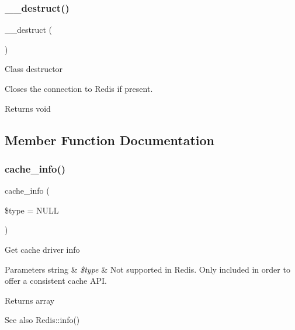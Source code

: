 \subsubsection{\texorpdfstring{\+\_\+\+\_\+destruct()}{\_\_destruct()}}
{\footnotesize\ttfamily \+\_\+\+\_\+destruct (\begin{DoxyParamCaption}{ }\end{DoxyParamCaption})}

Class destructor

Closes the connection to Redis if present.

\begin{DoxyReturn}{Returns}
void 
\end{DoxyReturn}


\subsection{Member Function Documentation}
\mbox{\label{class_c_i___cache__redis_aa8b9c4d9f0387156736ccd8850f0727e}} 
\subsubsection{\texorpdfstring{cache\+\_\+info()}{cache\_info()}}
{\footnotesize\ttfamily cache\+\_\+info (\begin{DoxyParamCaption}\item[{}]{\$type = {\ttfamily NULL} }\end{DoxyParamCaption})}

Get cache driver info


\begin{DoxyParams}[1]{Parameters}
string & {\em \$type} & Not supported in Redis. Only included in order to offer a consistent cache A\+PI. \\
\hline
\end{DoxyParams}
\begin{DoxyReturn}{Returns}
array 
\end{DoxyReturn}
\begin{DoxySeeAlso}{See also}
Redis\+::info() 
\end{DoxySeeAlso}
\mbox{\label{class_c_i___cache__redis_adb40b812890a8bc058bf6b7a0e1a54d9}} 
